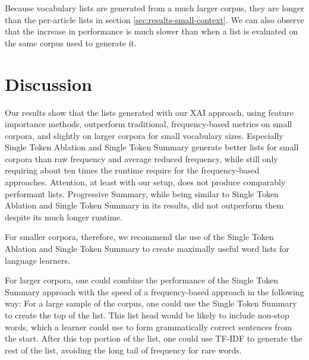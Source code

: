 % 		

Because vocabulary lists are generated from a much larger corpus, they are longer than the per-article lists in section \ref{sec:results-small-context}.
We can also observe that the increase in performance is much slower than when a list is evaluated on the same corpus used to generate it.


\section{Discussion} \label{sec:results-discussion}
Our results show that the lists generated with our XAI approach, using feature importance methods, outperform traditional, frequency-based metrics on small corpora, and slightly on larger corpora for small vocabulary sizes.
Especially Single Token Ablation and Single Token Summary generate better lists for small corpora than raw frequency and average reduced frequency, while still only requiring about ten times the runtime require for the frequency-based approaches.
Attention, at least with our setup, does not produce comparably performant lists.
Progressive Summary, while being similar to Single Token Ablation and Single Token Summary in its results, did not outperform them despite its much longer runtime.

For smaller corpora, therefore, we recommend the use of the Single Token Ablation and Single Token Summary to create maximally useful word lists for language learners.

For larger corpora, one could combine the performance of the Single Token Summary approach with the speed of a frequency-based approach in the following way:
For a large sample of the corpus, one could use the Single Token Summary to create the top of the list.
This list head would be likely to include non-stop words, which a learner could use to form grammatically correct sentences from the start.
After this top portion of the list, one could use TF-IDF to generate the rest of the list, avoiding the long tail of frequency for rare words.







